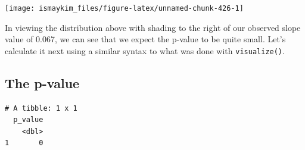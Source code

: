 \documentclass[12pt,]{krantz}
\makeatletter
\newenvironment{Shaded}{\begin{snugshade}}{\end{snugshade}}
\newcommand{\KeywordTok}[1]{\textcolor[rgb]{0.27,0.27,0.27}{\textbf{#1}}}
\newcommand{\DataTypeTok}[1]{\textcolor[rgb]{0.27,0.27,0.27}{#1}}
\newcommand{\DecValTok}[1]{\textcolor[rgb]{0.06,0.06,0.06}{#1}}
\newcommand{\StringTok}[1]{\textcolor[rgb]{0.5,0.5,0.5}{#1}}
\newcommand{\OperatorTok}[1]{\textcolor[rgb]{0.43,0.43,0.43}{\textbf{#1}}}
\newcommand{\NormalTok}[1]{#1}
\newenvironment{kframe}{%
\medskip{}
\setlength{\fboxsep}{.8em}
 \def\at@end@of@kframe{}%
 \ifinner\ifhmode%
  \def\at@end@of@kframe{\end{minipage}}%
  \begin{minipage}{\columnwidth}%
 \fi\fi%
 \def\FrameCommand##1{\hskip\@totalleftmargin \hskip-\fboxsep
 \colorbox{shadecolor}{##1}\hskip-\fboxsep
     \hskip-\linewidth \hskip-\@totalleftmargin \hskip\columnwidth}%
 \MakeFramed {\advance\hsize-\width
   \@totalleftmargin\z@ \linewidth\hsize
   \@setminipage}}%
 {\par\unskip\endMakeFramed%
 \at@end@of@kframe}
\renewenvironment{Shaded}{\begin{kframe}}{\end{kframe}}
\theoremstyle{definition}
\theoremstyle{definition}
\theoremstyle{definition}
\theoremstyle{remark}
\makeatother
\begin{document}
\begin{Shaded}
\end{Shaded}

\begin{Shaded}
\end{Shaded}

\begin{center}\texttt{[image: ismaykim\_files/figure-latex/unnamed-chunk-426-1]} \end{center}

In viewing the distribution above with shading to the right of our
observed slope value of 0.067, we can see that we expect the p-value to
be quite small. Let's calculate it next using a similar syntax to what
was done with \texttt{visualize()}.

\subsection{The p-value}\label{the-p-value-1}

\begin{Shaded}
\end{Shaded}

\begin{verbatim}
# A tibble: 1 x 1
  p_value
    <dbl>
1       0
\end{verbatim}
\end{document}
